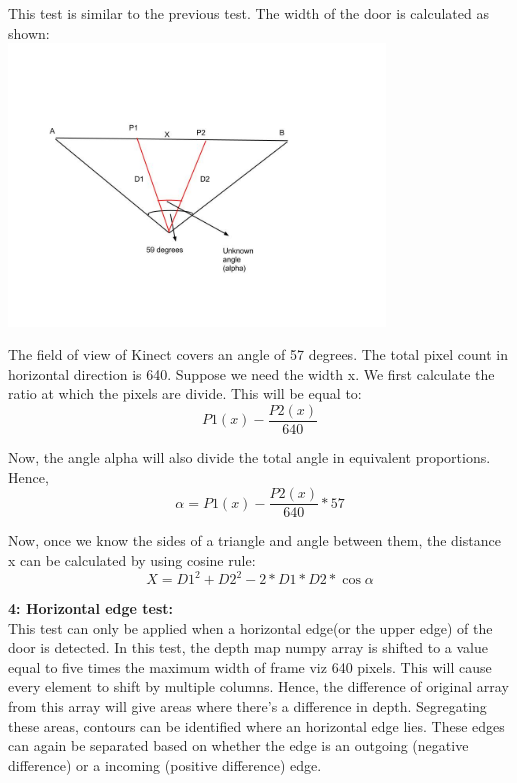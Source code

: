 \documentclass{report}
\begin{document}
This test is similar to the previous test. The width of the door is calculated as shown: \\

\includegraphics[width = 10cm]{Cosine.jpg}

The field of view of Kinect covers an angle of 57 degrees. The total pixel count in horizontal direction is 640. Suppose we need the width x. We first calculate the ratio at which the pixels are divide. This will be equal to:
\begin{equation}
P1(x) - \frac{P2(x)}{640}
\end{equation}

Now, the angle alpha will also divide the total angle in equivalent proportions. Hence, 
\begin{equation}
\alpha = P1(x) - \frac{P2(x)} {640} * 57
\end{equation}

Now, once we know the sides of a triangle and angle between them, the distance x can be calculated by using cosine rule:
\begin{equation}
X = D1^2 + D2^2 - 2*D1*D2*\cos{\alpha}
\end{equation}

\textbf{4: Horizontal edge test:} \\

This test can only be applied when a horizontal edge(or the upper edge) of the door is detected. In this test, the depth map numpy array is shifted to a value equal to five times the maximum width of frame viz 640 pixels. This will cause every element to shift by multiple columns. Hence, the difference of original array from this array will give areas where there's a difference in depth. Segregating these areas, contours can be identified where an horizontal edge lies. These edges can again be separated based on whether the edge is an outgoing (negative difference) or a incoming (positive difference) edge.
\end{document}
